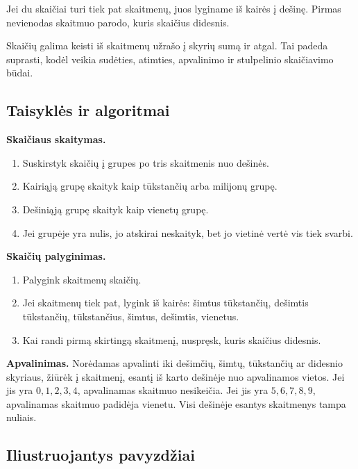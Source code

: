 \begin{savybe}
Jei du skaičiai turi tiek pat skaitmenų, juos lyginame iš kairės į dešinę. Pirmas nevienodas skaitmuo parodo, kuris skaičius didesnis.
\end{savybe}

\begin{savybe}
Skaičių galima keisti iš skaitmenų užrašo į skyrių sumą ir atgal. Tai padeda suprasti, kodėl veikia sudėties, atimties, apvalinimo ir stulpelinio skaičiavimo būdai.
\end{savybe}

\subsection{Taisyklės ir algoritmai}

\textbf{Skaičiaus skaitymas.}
\begin{enumerate}[label=\arabic*.]
\item Suskirstyk skaičių į grupes po tris skaitmenis nuo dešinės.
\item Kairiąją grupę skaityk kaip tūkstančių arba milijonų grupę.
\item Dešiniąją grupę skaityk kaip vienetų grupę.
\item Jei grupėje yra nulis, jo atskirai neskaityk, bet jo vietinė vertė vis tiek svarbi.
\end{enumerate}

\textbf{Skaičių palyginimas.}
\begin{enumerate}[label=\arabic*.]
\item Palygink skaitmenų skaičių.
\item Jei skaitmenų tiek pat, lygink iš kairės: šimtus tūkstančių, dešimtis tūkstančių, tūkstančius, šimtus, dešimtis, vienetus.
\item Kai randi pirmą skirtingą skaitmenį, nuspręsk, kuris skaičius didesnis.
\end{enumerate}

\textbf{Apvalinimas.}
Norėdamas apvalinti iki dešimčių, šimtų, tūkstančių ar didesnio skyriaus, žiūrėk į skaitmenį, esantį iš karto dešinėje nuo apvalinamos vietos. Jei jis yra \(0,1,2,3,4\), apvalinamas skaitmuo nesikeičia. Jei jis yra \(5,6,7,8,9\), apvalinamas skaitmuo padidėja vienetu. Visi dešinėje esantys skaitmenys tampa nuliais.

\subsection{Iliustruojantys pavyzdžiai}

